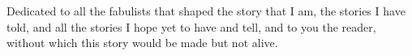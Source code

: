 \thispagestyle{empty}
{}

\vspace*{3cm}

\begin{center}
    Dedicated to all the fabulists that shaped the story that I am, the stories I have told,
    and all the stories I hope yet to have and tell, and to you the reader, without which this
    story would be made but not alive.
\end{center}
